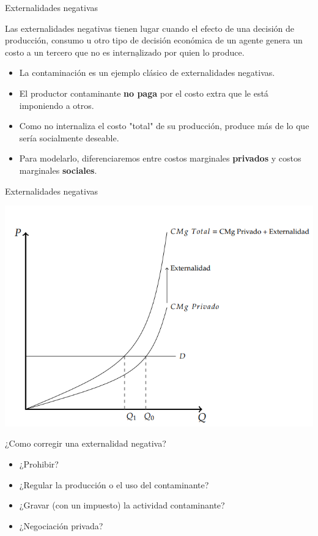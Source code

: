 \documentclass{beamer}
\begin{document}
\begin{frame}{Externalidades negativas}
    \begin{boxA}
        \centering
        Las externalidades negativas tienen lugar cuando el efecto de
        una decisión de producción, consumo u otro tipo de decisión
        económica de un agente genera un costo a un tercero que no es
        $\underline{\text{internalizado}}$ por quien lo produce.
    \end{boxA}
    \begin{itemize}
        \item La contaminación es un ejemplo clásico de externalidades negativas.
        \item El productor contaminante \textbf{no paga} por el costo extra que le está imponiendo a otros.
        \item Como no internaliza el costo "total" de su producción, produce más de lo que sería socialmente deseable.
        \item Para modelarlo, diferenciaremos entre costos marginales \textbf{privados} y costos marginales \textbf{sociales}.
    \end{itemize}
\end{frame}

\begin{frame}{Externalidades negativas}
    \begin{center}
        \includegraphics[scale=0.7]{../Figures/C25.2.png}
    \end{center}
\end{frame}

\begin{frame}{¿Como corregir una externalidad negativa?}
    \begin{itemize}
        \item ¿Prohibir?
        \item ¿Regular la producción o el uso del contaminante?
        \item ¿Gravar (con un impuesto) la actividad contaminante?
        \item ¿Negociación privada?
    \end{itemize}
\end{frame}
\end{document}
